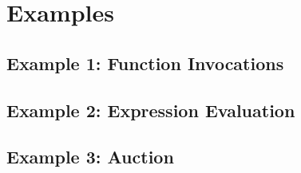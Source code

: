 
\chapter{Examples}

\section{Example 1: Function Invocations}

\section{Example 2: Expression Evaluation}

\section{Example 3: Auction}